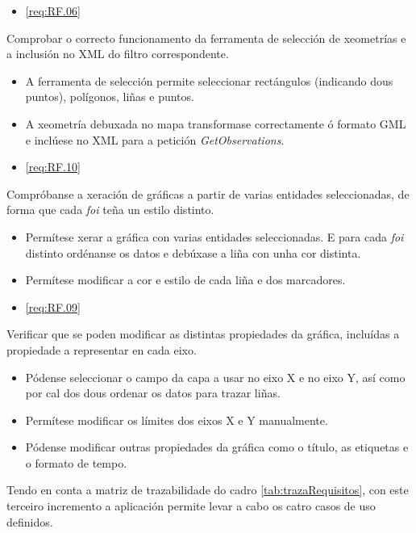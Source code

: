 		  {\begin{itemize}\item \ref{req:RF.06} \\\end{itemize}} %
		  {Comprobar o correcto funcionamento da ferramenta de selección de xeometrías e a inclusión no XML do filtro correspondente.} %
		  {\begin{itemize}
		  \item A ferramenta de selección permite seleccionar rectángulos (indicando dous puntos), polígonos, liñas e puntos.
		  \item A xeometría debuxada no mapa transformase correctamente ó formato GML e inclúese no XML para a petición \emph{GetObservations}.
		  \end{itemize}} %
		  
		  {\begin{itemize}\item \ref{req:RF.10} \\\end{itemize}} %
		  {Compróbanse a xeración de gráficas a partir de varias entidades seleccionadas, de forma que cada \emph{foi} teña un estilo distinto.} %
		  {\begin{itemize}
		  \item Permítese xerar a gráfica con varias entidades seleccionadas. E para cada \emph{foi} distinto ordénanse os datos e debúxase a liña con unha cor distinta.
		  \item Permítese modificar a cor e estilo de cada liña e dos marcadores.
		  \end{itemize}} %
		  
		  {\begin{itemize}\item \ref{req:RF.09} \\\end{itemize}} %
		  {Verificar que se poden modificar as distintas propiedades da gráfica, incluídas a propiedade a representar en cada eixo.} %
		  {\begin{itemize}
		  \item Pódense seleccionar o campo da capa a usar no eixo X e no eixo Y, así como por cal dos dous ordenar os datos para trazar liñas.
		  \item Permítese modificar os límites dos eixos X e Y manualmente.
		  \item Pódense modificar outras propiedades da gráfica como o título, as etiquetas e o formato de tempo.
		  \end{itemize}} %
		  
Tendo en conta a matriz de trazabilidade do cadro \ref{tab:trazaRequisitos}, con este terceiro incremento a aplicación permite levar a cabo os catro casos de uso definidos.